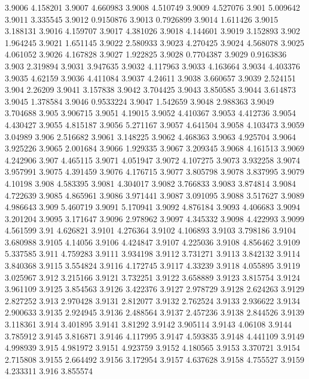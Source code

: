3.9006  4.158201
3.9007  4.660983
3.9008  4.510749
3.9009  4.527076
3.901  5.009642
3.9011  3.335545
3.9012  0.9150876
3.9013  0.7926899
3.9014  1.611426
3.9015  3.188131
3.9016  4.159707
3.9017  4.381026
3.9018  4.144601
3.9019  3.152893
3.902  1.964245
3.9021  1.651145
3.9022  2.580933
3.9023  4.270425
3.9024  4.568078
3.9025  4.061052
3.9026  4.167828
3.9027  1.922825
3.9028  0.7704387
3.9029  0.9163836
3.903  2.319894
3.9031  3.947635
3.9032  4.117963
3.9033  4.163664
3.9034  4.403376
3.9035  4.62159
3.9036  4.411084
3.9037  4.24611
3.9038  3.660657
3.9039  2.524151
3.904  2.26209
3.9041  3.157838
3.9042  3.704425
3.9043  3.850585
3.9044  3.614873
3.9045  1.378584
3.9046  0.9533224
3.9047  1.542659
3.9048  2.988363
3.9049  3.704688
3.905  3.906715
3.9051  4.19015
3.9052  4.410367
3.9053  4.412736
3.9054  4.430427
3.9055  4.815187
3.9056  5.271167
3.9057  4.641504
3.9058  4.103473
3.9059  3.04989
3.906  2.516682
3.9061  3.148225
3.9062  4.468363
3.9063  4.925704
3.9064  3.925226
3.9065  2.001684
3.9066  1.929335
3.9067  3.209345
3.9068  4.161513
3.9069  4.242906
3.907  4.465115
3.9071  4.051947
3.9072  4.107275
3.9073  3.932258
3.9074  3.957991
3.9075  4.391459
3.9076  4.176715
3.9077  3.805798
3.9078  3.837995
3.9079  4.10198
3.908  4.583395
3.9081  4.304017
3.9082  3.766833
3.9083  3.874814
3.9084  4.722639
3.9085  4.865961
3.9086  3.971441
3.9087  3.091095
3.9088  3.517627
3.9089  4.986643
3.909  5.460719
3.9091  5.170941
3.9092  4.876184
3.9093  4.406683
3.9094  3.201204
3.9095  3.171647
3.9096  2.978962
3.9097  4.345332
3.9098  4.422993
3.9099  4.561599
3.91  4.626821
3.9101  4.276364
3.9102  4.106893
3.9103  3.798186
3.9104  3.680988
3.9105  4.14056
3.9106  4.424847
3.9107  4.225036
3.9108  4.856462
3.9109  5.337585
3.911  4.759283
3.9111  3.934198
3.9112  3.731271
3.9113  3.842132
3.9114  3.840368
3.9115  3.554824
3.9116  4.172745
3.9117  4.33239
3.9118  4.055895
3.9119  3.025967
3.912  3.215166
3.9121  3.732251
3.9122  3.658889
3.9123  3.815754
3.9124  3.961109
3.9125  3.854563
3.9126  3.422376
3.9127  2.978729
3.9128  2.624263
3.9129  2.827252
3.913  2.970428
3.9131  2.812077
3.9132  2.762524
3.9133  2.936622
3.9134  2.900633
3.9135  2.924945
3.9136  2.488564
3.9137  2.457236
3.9138  2.844526
3.9139  3.118361
3.914  3.401895
3.9141  3.81292
3.9142  3.905114
3.9143  4.06108
3.9144  3.785912
3.9145  3.816871
3.9146  4.117995
3.9147  4.593835
3.9148  4.441109
3.9149  4.998939
3.915  4.981972
3.9151  4.923759
3.9152  4.180565
3.9153  3.370721
3.9154  2.715808
3.9155  2.664492
3.9156  3.172954
3.9157  4.637628
3.9158  4.755527
3.9159  4.233311
3.916  3.855574
